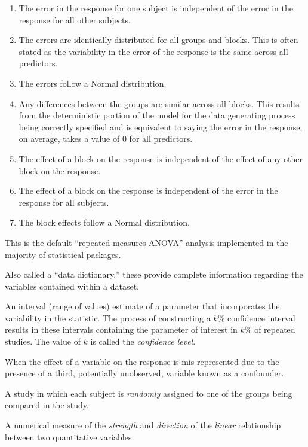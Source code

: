 \documentclass[
  letterpaper,
  DIV=11,
  numbers=noendperiod]{scrreprt}
\providecommand{\tightlist}{%
  \setlength{\itemsep}{0pt}\setlength{\parskip}{0pt}}\usepackage{longtable,booktabs,array}
\theoremstyle{definition}
\theoremstyle{definition}
\theoremstyle{plain}
\theoremstyle{remark}
\begin{document}
\begin{enumerate}
\def\labelenumi{\arabic{enumi}.}
\tightlist
\item
  The error in the response for one subject is independent of the error
  in the response for all other subjects.
\item
  The errors are identically distributed for all groups and blocks. This
  is often stated as the variability in the error of the response is the
  same across all predictors.
\item
  The errors follow a Normal distribution.
\item
  Any differences between the groups are similar across all blocks. This
  results from the deterministic portion of the model for the data
  generating process being correctly specified and is equivalent to
  saying the error in the response, on average, takes a value of 0 for
  all predictors.
\item
  The effect of a block on the response is independent of the effect of
  any other block on the response.
\item
  The effect of a block on the response is independent of the error in
  the response for all subjects.
\item
  The block effects follow a Normal distribution.
\end{enumerate}

This is the default ``repeated measures ANOVA'' analysis implemented in
the majority of statistical packages.

\begin{description}
\tightlist
\item[Codebook (Definition~\ref{def-codebook})]
Also called a ``data dictionary,'' these provide complete information
regarding the variables contained within a dataset.
\item[Confidence Interval (Definition~\ref{def-confidence-interval})]
An interval (range of values) estimate of a parameter that incorporates
the variability in the statistic. The process of constructing a \(k\)\%
confidence interval results in these intervals containing the parameter
of interest in \(k\)\% of repeated studies. The value of \(k\) is called
the \emph{confidence level}.
\item[Confounding (Definition~\ref{def-confounding})]
When the effect of a variable on the response is mis-represented due to
the presence of a third, potentially unobserved, variable known as a
confounder.
\item[Controlled Experiment
(Definition~\ref{def-controlled-experiment})]
A study in which each subject is \emph{randomly} assigned to one of the
groups being compared in the study.
\item[Correlation Coefficient
(Definition~\ref{def-correlation-coefficient})]
A numerical measure of the \emph{strength} and \emph{direction} of the
\emph{linear} relationship between two quantitative variables.
\end{description}
\end{document}
